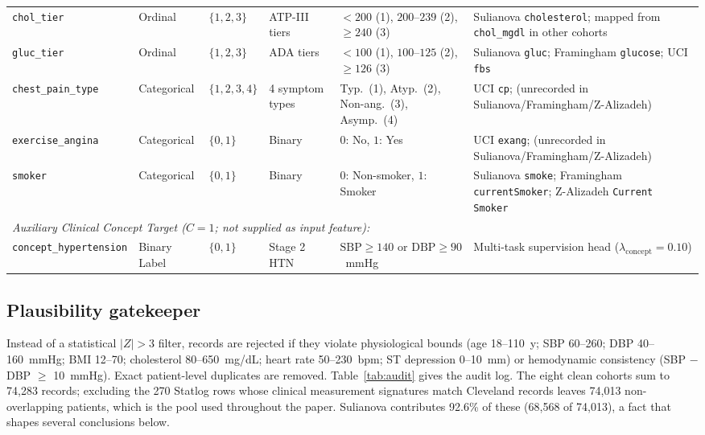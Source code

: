 \documentclass[journal]{IEEEtran}
\begin{document}
\begin{table}[t]
\begin{tabular}{lllllp{4.6cm}}
\texttt{chol\_tier} & Ordinal & $\{1, 2, 3\}$ & ATP-III tiers & $<200$ (1), $200$--$239$ (2), $\ge 240$ (3) & Sulianova \texttt{cholesterol}; mapped from \texttt{chol\_mgdl} in other cohorts\\
\texttt{gluc\_tier} & Ordinal & $\{1, 2, 3\}$ & ADA tiers & $<100$ (1), $100$--$125$ (2), $\ge 126$ (3) & Sulianova \texttt{gluc}; Framingham \texttt{glucose}; UCI \texttt{fbs}\\
\texttt{chest\_pain\_type} & Categorical & $\{1, 2, 3, 4\}$ & 4 symptom types & Typ.\ (1), Atyp.\ (2), Non-ang.\ (3), Asymp.\ (4) & UCI \texttt{cp}; (unrecorded in Sulianova/Framingham/Z-Alizadeh)\\
\texttt{exercise\_angina} & Categorical & $\{0, 1\}$ & Binary & $0$: No, $1$: Yes & UCI \texttt{exang}; (unrecorded in Sulianova/Framingham/Z-Alizadeh)\\
\texttt{smoker} & Categorical & $\{0, 1\}$ & Binary & $0$: Non-smoker, $1$: Smoker & Sulianova \texttt{smoke}; Framingham \texttt{currentSmoker}; Z-Alizadeh \texttt{Current Smoker}\\
\midrule
\multicolumn{6}{l}{\emph{Auxiliary Clinical Concept Target ($C=1$; not supplied as input feature):}}\\
\texttt{concept\_hypertension} & Binary Label & $\{0, 1\}$ & Stage 2 HTN & $\mathrm{SBP}\ge 140$ or $\mathrm{DBP}\ge 90$~mmHg & Multi-task supervision head ($\lambda_{\mathrm{concept}}=0.10$)\\
\bottomrule
\end{tabular}
\end{table}

\subsection{Plausibility gatekeeper}
Instead of a statistical $|Z|>3$ filter, records are rejected if they violate physiological bounds (age 18--110~y; SBP 60--260; DBP 40--160~mmHg; BMI 12--70; cholesterol 80--650~mg/dL; heart rate 50--230~bpm; ST depression 0--10~mm) or hemodynamic consistency (SBP $-$ DBP $\ge$ 10~mmHg). Exact patient-level duplicates are removed. Table~\ref{tab:audit} gives the audit log. The eight clean cohorts sum to 74{,}283 records; excluding the 270 Statlog rows whose clinical measurement signatures match Cleveland records leaves 74{,}013 non-overlapping patients, which is the pool used throughout the paper. Sulianova contributes 92.6\% of these (68{,}568 of 74{,}013), a fact that shapes several conclusions below.
\end{document}
